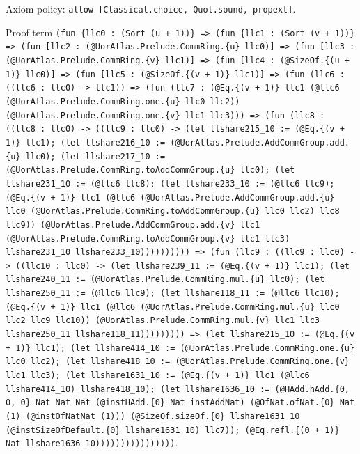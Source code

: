 \documentclass[11pt]{article}
\begin{document}
\noindent Axiom policy: \texttt{allow [Classical.choice, Quot.sound, propext]}.\par
\noindent Proof term \texttt{(fun \{llc0 : (Sort (u + 1))\} => (fun \{llc1 : (Sort (v + 1))\} => (fun [llc2 : (@UorAtlas.Prelude.CommRing.\{u\} llc0)] => (fun [llc3 : (@UorAtlas.Prelude.CommRing.\{v\} llc1)] => (fun [llc4 : (@SizeOf.\{(u + 1)\} llc0)] => (fun [llc5 : (@SizeOf.\{(v + 1)\} llc1)] => (fun (llc6 : ((llc6 : llc0) -> llc1)) => (fun (llc7 : (@Eq.\{(v + 1)\} llc1 (@llc6 (@UorAtlas.Prelude.CommRing.one.\{u\} llc0 llc2)) (@UorAtlas.Prelude.CommRing.one.\{v\} llc1 llc3))) => (fun (llc8 : ((llc8 : llc0) -> ((llc9 : llc0) -> (let llshare215\_10 := (@Eq.\{(v + 1)\} llc1); (let llshare216\_10 := (@UorAtlas.Prelude.AddCommGroup.add.\{u\} llc0); (let llshare217\_10 := (@UorAtlas.Prelude.CommRing.toAddCommGroup.\{u\} llc0); (let llshare231\_10 := (@llc6 llc8); (let llshare233\_10 := (@llc6 llc9); (@Eq.\{(v + 1)\} llc1 (@llc6 (@UorAtlas.Prelude.AddCommGroup.add.\{u\} llc0 (@UorAtlas.Prelude.CommRing.toAddCommGroup.\{u\} llc0 llc2) llc8 llc9)) (@UorAtlas.Prelude.AddCommGroup.add.\{v\} llc1 (@UorAtlas.Prelude.CommRing.toAddCommGroup.\{v\} llc1 llc3) llshare231\_10 llshare233\_10)))))))))) => (fun (llc9 : ((llc9 : llc0) -> ((llc10 : llc0) -> (let llshare239\_11 := (@Eq.\{(v + 1)\} llc1); (let llshare240\_11 := (@UorAtlas.Prelude.CommRing.mul.\{u\} llc0); (let llshare250\_11 := (@llc6 llc9); (let llshare118\_11 := (@llc6 llc10); (@Eq.\{(v + 1)\} llc1 (@llc6 (@UorAtlas.Prelude.CommRing.mul.\{u\} llc0 llc2 llc9 llc10)) (@UorAtlas.Prelude.CommRing.mul.\{v\} llc1 llc3 llshare250\_11 llshare118\_11))))))))) => (let llshare215\_10 := (@Eq.\{(v + 1)\} llc1); (let llshare414\_10 := (@UorAtlas.Prelude.CommRing.one.\{u\} llc0 llc2); (let llshare418\_10 := (@UorAtlas.Prelude.CommRing.one.\{v\} llc1 llc3); (let llshare1631\_10 := (@Eq.\{(v + 1)\} llc1 (@llc6 llshare414\_10) llshare418\_10); (let llshare1636\_10 := (@HAdd.hAdd.\{0, 0, 0\} Nat Nat Nat (@instHAdd.\{0\} Nat instAddNat) (@OfNat.ofNat.\{0\} Nat (1) (@instOfNatNat (1))) (@SizeOf.sizeOf.\{0\} llshare1631\_10 (@instSizeOfDefault.\{0\} llshare1631\_10) llc7)); (@Eq.refl.\{(0 + 1)\} Nat llshare1636\_10))))))))))))))))}.\par
\end{document}
